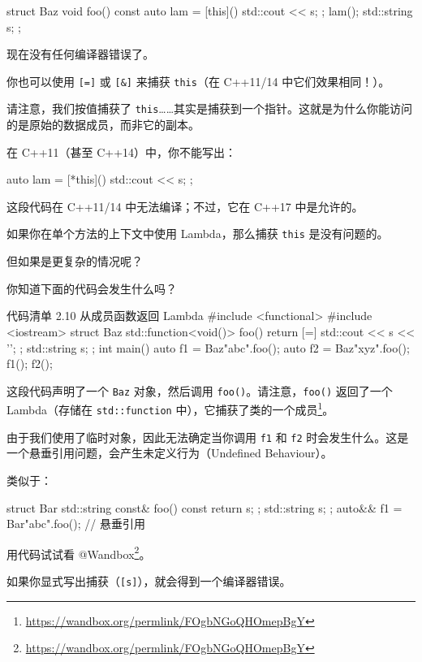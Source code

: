 \begin{codebox}
\begin{codebox}
struct Baz {
void foo() {
const auto lam = [this]() { std::cout << s; };
lam();
}
std::string s;
};
\end{codebox}

现在没有任何编译器错误了。

你也可以使用 \texttt{[=]} 或 \texttt{[\&]} 来捕获 \texttt{this}（在 C++11/14 中它们效果相同！）。

请注意，我们按值捕获了 \texttt{this}……其实是捕获到一个指针。这就是为什么你能访问的是原始的数据成员，而非它的副本。

在 C++11（甚至 C++14）中，你不能写出：

\begin{codebox}
auto lam = [*this]() { std::cout << s; };
\end{codebox}

这段代码在 C++11/14 中无法编译；不过，它在 C++17 中是允许的。

如果你在单个方法的上下文中使用 Lambda，那么捕获 \texttt{this} 是没有问题的。

但如果是更复杂的情况呢？

你知道下面的代码会发生什么吗？

\begin{codeboxt}{代码清单 2.10 从成员函数返回 Lambda}
#include <functional>
#include <iostream>
struct Baz {
std::function<void()> foo() {
return [=] { std::cout << s << '\n'; };
}
std::string s;
};
int main() {
auto f1 = Baz{"abc"}.foo();
auto f2 = Baz{"xyz"}.foo();
f1();
f2();
}
\end{codeboxt}

这段代码声明了一个 \texttt{Baz} 对象，然后调用 \texttt{foo()}。请注意，\texttt{foo()} 返回了一个 Lambda（存储在 \texttt{std::function} 中），它捕获了类的一个成员\footnote{\url{https://wandbox.org/permlink/FOgbNGoQHOmepBgY}}。

由于我们使用了临时对象，因此无法确定当你调用 \texttt{f1} 和 \texttt{f2} 时会发生什么。这是一个悬垂引用问题，会产生未定义行为（Undefined Behaviour）。

类似于：

\begin{codebox}
struct Bar {
std::string const& foo() const { return s; };
std::string s;
};
auto&& f1 = Bar{"abc"}.foo(); // 悬垂引用
\end{codebox}

用代码试试看 @Wandbox\footnote{\url{https://wandbox.org/permlink/FOgbNGoQHOmepBgY}}。

如果你显式写出捕获（\texttt{[s]}），就会得到一个编译器错误。


\end{codebox}
